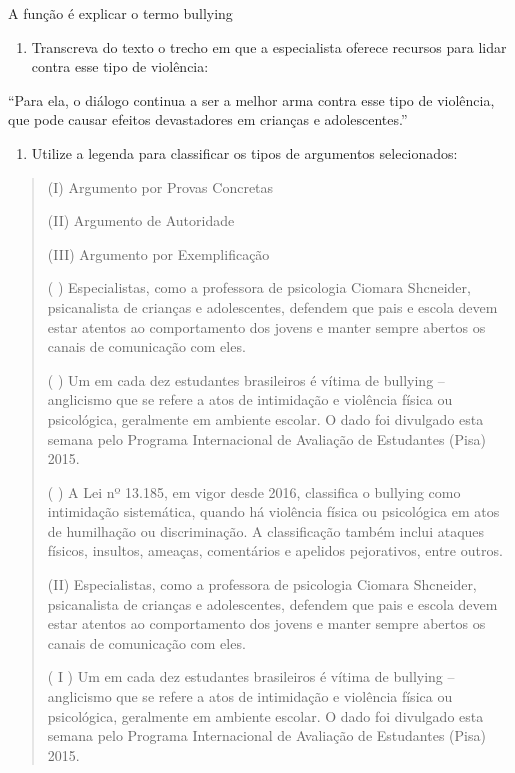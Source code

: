 {A função é explicar o termo bullying

\begin{enumerate}
\def\labelenumi{\arabic{enumi})}
\setcounter{enumi}{3}
\tightlist
\item
  Transcreva do texto o trecho em que a especialista oferece recursos
  para lidar contra esse tipo de violência:
\end{enumerate}

``Para ela, o diálogo continua a ser a melhor arma contra esse tipo de
violência, que pode causar efeitos devastadores em crianças e
adolescentes.''

\begin{enumerate}
\def\labelenumi{\arabic{enumi})}
\setcounter{enumi}{4}
\tightlist
\item
  Utilize a legenda para classificar os tipos de argumentos
  selecionados:
\end{enumerate}

\begin{quote}
(I) Argumento por Provas Concretas

(II) Argumento de Autoridade

(III) Argumento por Exemplificação

( ) Especialistas, como a professora de psicologia Ciomara Shcneider,
psicanalista de crianças e adolescentes, defendem que pais e escola
devem estar atentos ao comportamento dos jovens e manter sempre abertos
os canais de comunicação com eles.

( ) Um em cada dez estudantes brasileiros é vítima de bullying --
anglicismo que se refere a atos de intimidação e violência física ou
psicológica, geralmente em ambiente escolar. O dado foi divulgado esta
semana pelo Programa Internacional de Avaliação de Estudantes (Pisa)
2015.

( ) A Lei nº 13.185, em vigor desde 2016, classifica o bullying como
intimidação sistemática, quando há violência física ou psicológica em
atos de humilhação ou discriminação. A classificação também inclui
ataques físicos, insultos, ameaças, comentários e apelidos pejorativos,
entre outros.

(II) Especialistas, como a professora de psicologia Ciomara Shcneider,
psicanalista de crianças e adolescentes, defendem que pais e escola
devem estar atentos ao comportamento dos jovens e manter sempre abertos
os canais de comunicação com eles.

( I ) Um em cada dez estudantes brasileiros é vítima de bullying --
anglicismo que se refere a atos de intimidação e violência física ou
psicológica, geralmente em ambiente escolar. O dado foi divulgado esta
semana pelo Programa Internacional de Avaliação de Estudantes (Pisa)
2015.


\end{quote}}
